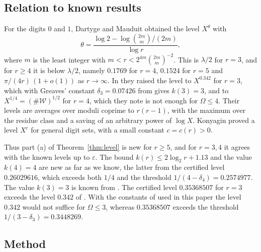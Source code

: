 \documentclass[11pt]{amsart}
\theoremstyle{definition}
\numberwithin{equation}{section}
\newcommand{\WW}{\mathcal{W}}
\begin{document}
\subsection{Relation to known results}

For the digits $0$ and $1$, Dartyge and Mauduit \cite[Thm.~3]{DM00} obtained the level $X^{\theta}$ with
\[
\theta=\frac{\log2-\log\binom{2m}{m}/(2m)}{\log r},
\]
where $m$ is the least integer with $m<r<2^{4m}\binom{2m}{m}^{-2}$. This is $\lambda/2$ for $r=3$, and for $r\ge4$ it is below $\lambda/2$, namely $0.1769$ for $r=4$, $0.1524$ for $r=5$ and $\pi/(4r)\,(1+o(1))$ as $r\to\infty$. In \cite[Thm.~3]{DM01} they raised the level to $X^{0.342}$ for $r=3$, which with Greaves' constant $\delta_3=0.07426$ from \cite{Gr89} gives $k(3)=3$, and to $X^{1/4}=(\#\WW)^{1/2}$ for $r=4$, which they note is not enough for $\Omega\le4$. Their levels are averages over moduli coprime to $r(r-1)$, with the maximum over the residue class and a saving of an arbitrary power of $\log X$. Konyagin \cite[Cor.~2]{Ko01} proved a level $X^{c}$ for general digit sets, with a small constant $c=c(r)>0$.

Thus part (a) of Theorem~\ref{thm:level} is new for $r\ge5$, and for $r=3,4$ it agrees with the known levels up to $\varepsilon$. The bound $k(r)\le2\log_2r+1.13$ and the value $k(4)=4$ are new as far as we know, the latter from the certified level $0.26029616$, which exceeds both $1/4$ and the threshold $1/(4-\delta_4)=0.2574977$. The value $k(3)=3$ is known from \cite{DM01}. The certified level $0.35368507$ for $r=3$ exceeds the level $0.342$ of \cite{DM01}. With the constants of \cite{Gr82} used in this paper the level $0.342$ would not suffice for $\Omega\le3$, whereas $0.35368507$ exceeds the threshold $1/(3-\delta_3)=0.3448269$.

\subsection{Method}
\end{document}
